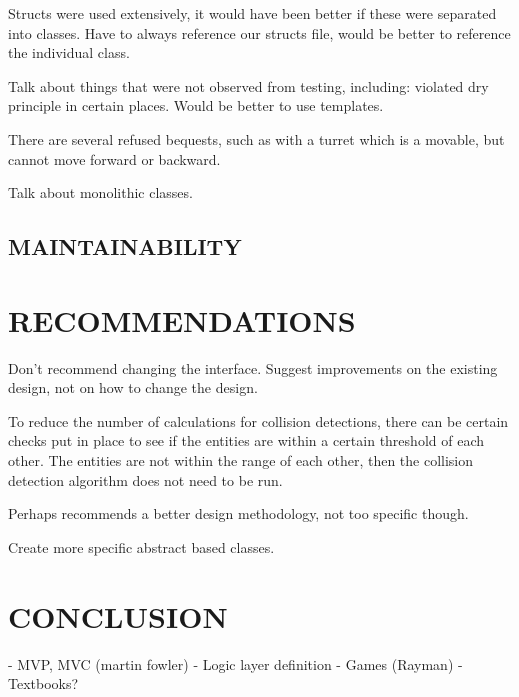 \documentclass[10pt,twocolumn]{witseiepaper}
\begin{document}
Structs were used extensively, it would have been better if these were separated into classes. Have to always reference our structs file, would be better to reference the individual class. 

Talk about things that were not observed from testing, including: violated dry principle in certain places. Would be better to use templates.

There are several refused bequests, such as with a turret which is a movable, but cannot move forward or backward.

Talk about monolithic classes.

\subsection{MAINTAINABILITY}

%
\section{RECOMMENDATIONS} %
Don't recommend changing the interface. Suggest improvements on the existing design, not on how to change the design.

To reduce the number of calculations for collision detections, there can be certain checks put in place to see if the entities are within a certain threshold of each other. The entities are not within the range of each other, then the collision detection algorithm does not need to be run.

Perhaps recommends a better design methodology, not too specific though.

Create more specific abstract based classes.




%
\section{CONCLUSION}


\balance

%



- MVP, MVC (martin fowler)
- Logic layer definition
- Games (Rayman)
- Textbooks?
\end{document}
